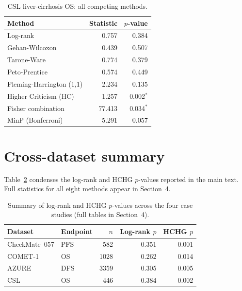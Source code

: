 \documentclass[11pt]{article}
\newcommand{\sig}{$^{\ast}$}
\begin{document}
\begin{table}[h]
  \centering
  \caption{CSL liver-cirrhosis OS: all competing methods.}
  \label{tab:csl}
  \begin{tabular}{@{}lrr@{}}
    \toprule
    Method & Statistic & $p$-value \\
    \midrule
    Log-rank                         &  0.757 & 0.384 \\
    Gehan-Wilcoxon                   &  0.439 & 0.507 \\
    Tarone-Ware                      &  0.774 & 0.379 \\
    Peto-Prentice                    &  0.574 & 0.449 \\
    Fleming-Harrington (1,1)         &  2.234 & 0.135 \\
    Higher Criticism (HC)            &  1.257 & 0.002\sig \\
    Fisher combination               &  77.413 & 0.034\sig \\
    MinP (Bonferroni)                &  5.291 & 0.057 \\
    \bottomrule
  \end{tabular}
\end{table}

\section{Cross-dataset summary}

Table~\ref{tab:summary} condenses the log-rank and HCHG $p$-values
reported in the main text.  Full statistics for all eight methods appear
in Section~4.

\begin{table}[h]
  \centering
  \caption{Summary of log-rank and HCHG $p$-values across the four
           case studies (full tables in Section~4).}
  \label{tab:summary}
  \small
  \begin{tabular}{@{}llrrr@{}}
    \toprule
    Dataset & Endpoint & $n$ & Log-rank $p$ & HCHG $p$ \\
    \midrule
    CheckMate~057  & PFS &  582 & 0.351 & 0.001 \\
    COMET-1        & OS  & 1028 & 0.262 & 0.014 \\
    AZURE          & DFS & 3359 & 0.305 & 0.005 \\
    CSL            & OS  &  446 & 0.384 & 0.002 \\
    \bottomrule
  \end{tabular}
\end{table}
\end{document}
